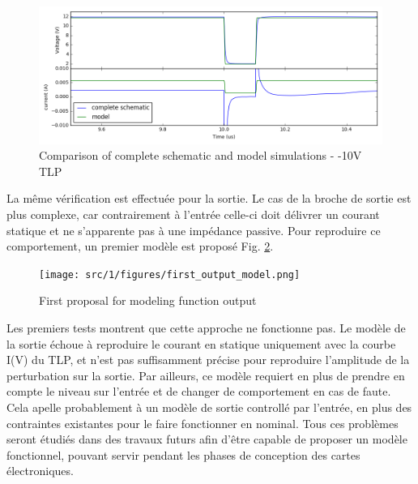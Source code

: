 \begin{figure}[!h]
  \centering
  \includegraphics[width=\textwidth]{src/1/figures/comparison_model_total_m10V.png}
  \caption{Comparison of complete schematic and model simulations - -10V TLP}
  \label{fig:compare-model-simu-m10}
\end{figure}

La même vérification est effectuée pour la sortie.
Le cas de la broche de sortie est plus complexe, car contrairement à l'entrée celle-ci doit délivrer un courant statique et ne s'apparente pas à une impédance passive.
Pour reproduire ce comportement, un premier modèle est proposé Fig. \ref{fig:first-output-model}.

\begin{figure}[!h]
  \centering
  \texttt{[image: src/1/figures/first\_output\_model.png]}
  \caption{First proposal for modeling function output}
  \label{fig:first-output-model}
\end{figure}

Les premiers tests montrent que cette approche ne fonctionne pas.
Le modèle de la sortie échoue à reproduire le courant en statique uniquement avec la courbe I(V) du TLP, et n'est pas suffisamment précise pour reproduire l'amplitude de la perturbation sur la sortie.
Par ailleurs, ce modèle requiert en plus de prendre en compte le niveau sur l'entrée et de changer de comportement en cas de faute.
Cela apelle probablement à un modèle de sortie controllé par l'entrée, en plus des contraintes existantes pour le faire fonctionner en nominal.
Tous ces problèmes seront étudiés dans des travaux futurs afin d'être capable de proposer un modèle fonctionnel, pouvant servir pendant les phases de conception des cartes électroniques.

